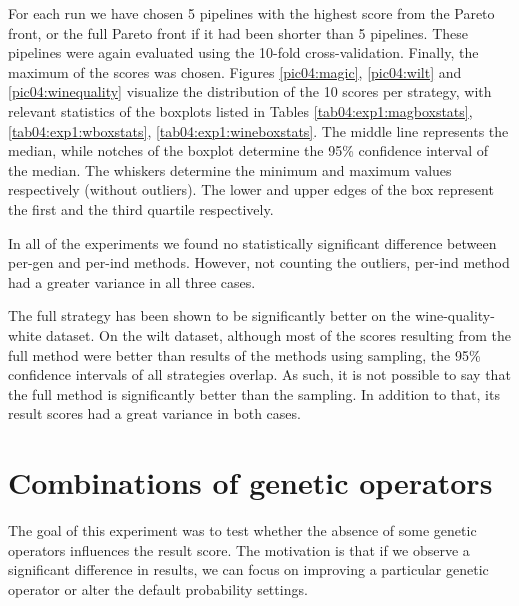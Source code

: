For each run we have chosen 5 pipelines with the highest score
from the Pareto front, or the full Pareto front if it had been shorter than 5
pipelines. These pipelines were again evaluated using the 10-fold
cross-validation. Finally, the maximum of the scores was chosen. Figures
\ref{pic04:magic}, \ref{pic04:wilt} and \ref{pic04:winequality} visualize the
distribution of the 10 scores per strategy, with relevant statistics of the
boxplots listed in Tables \ref{tab04:exp1:magboxstats},
\ref{tab04:exp1:wboxstats}, \ref{tab04:exp1:wineboxstats}. The middle line
represents the median, while notches of the boxplot determine the 95\%
confidence interval of the median. The whiskers determine the minimum and
maximum values respectively (without outliers). The lower and upper edges of
the box represent the first and the third quartile respectively.

In all of the experiments we found no statistically significant difference
between per-gen and per-ind methods. However, not counting
the outliers, per-ind method had a greater variance in all three cases.

The full strategy has been shown to be significantly better on the
wine-quality-white dataset. On the wilt dataset, although most of the scores
resulting from the full method were better than results of the methods
using sampling, the 95\% confidence intervals of all strategies overlap. As
such, it is not possible to say that the full method is significantly
better than the sampling. In addition to that, its result scores had a great
variance in both cases.







\section{Combinations of genetic operators} \label{sec:exp:genop}
The goal of this experiment was to test whether the absence of some genetic
operators influences the result score. The motivation is that if we observe a
significant difference in results, we can focus on improving a particular
genetic operator or alter the default probability settings.

